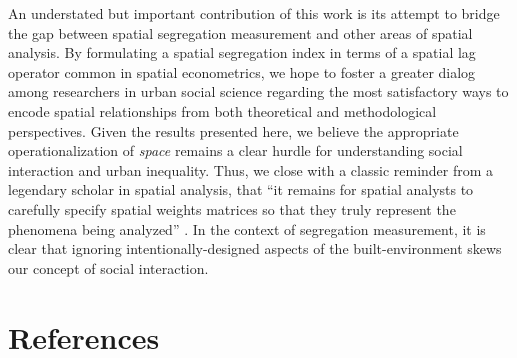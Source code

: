 \documentclass[
  10pt,
]{article}
\begin{document}
An understated but important contribution of this work is its attempt to
bridge the gap between spatial segregation measurement and other areas
of spatial analysis. By formulating a spatial segregation index in terms
of a spatial lag operator common in spatial econometrics, we hope to
foster a greater dialog among researchers in urban social science
regarding the most satisfactory ways to encode spatial relationships
from both theoretical and methodological perspectives. Given the results
presented here, we believe the appropriate operationalization of
\emph{space} remains a clear hurdle for understanding social interaction
and urban inequality. Thus, we close with a classic reminder from a
legendary scholar in spatial analysis, that ``it remains for spatial
analysts to carefully specify spatial weights matrices so that they
truly represent the phenomena being analyzed''
\citep[p.409]{getis2009SpatialWeights}. In the context of segregation
measurement, it is clear that ignoring intentionally-designed aspects of
the built-environment skews our concept of social interaction.

\hypertarget{references}{%
\section{References}\label{references}}


  
\end{document}
